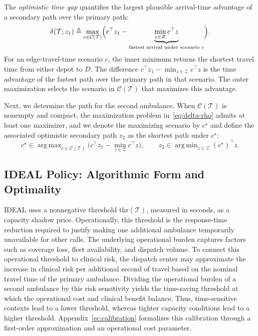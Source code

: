\documentclass[11pt, letterpaper, oneside, reqno]{amsart}
\DeclareMathOperator*{\argmin}{arg\,min}
\DeclareMathOperator*{\argmax}{arg\,max}
\newcommand{\opt}{^\star}
\newcommand{\Let}{\triangleq}
\begin{document}
The \textit{optimistic time gap} quantifies the largest plausible arrival-time advantage of a secondary path over the primary path:
\begin{equation}
\label{eq:delta-rho}
\delta(\mathcal T; z_1) \Let
\max_{c\in\mathcal C(\mathcal T)}
\Bigl( c^\top z_1  -  \underbrace{\min_{z \in\mathcal Z} c^\top z}_{\text{fastest arrival under scenario } c} \Bigr).
\end{equation}
For an edge-travel-time scenario $c$, the inner minimum returns the shortest travel time from either depot to $D$. The difference $c^\top z_1 - \min_{z\in\mathcal Z} c^\top z$ is the time advantage of the fastest path over the primary path in that scenario. The outer maximization selects the scenario in $\mathcal C(\mathcal T)$ that maximizes this advantage.

Next, we determine the path for the second ambulance. When $\mathcal C(\mathcal T)$ is nonempty and compact, the maximization problem in~\eqref{eq:delta-rho} admits at least one maximizer, and we denote the maximizing scenario by $c\opt$ and define the associated optimistic secondary path $z_2$ as the shortest path under $c\opt$:
\[
c\opt \in \argmax_{c\in\mathcal C(\mathcal T)}
\bigl(c^\top z_1 - \min_{z\in\mathcal Z} c^\top z\bigr), \qquad z_2 \in \argmin_{z\in\mathcal Z} (c\opt)^\top z.
\]


\subsection{IDEAL Policy: Algorithmic Form and Optimality} \label{sec:ideal-policy}
IDEAL uses a nonnegative threshold $\mathrm{thr}(\mathcal T)$, measured in seconds, as a capacity shadow price. Operationally, this threshold is the response-time reduction required to justify making one additional ambulance temporarily unavailable for other calls. The underlying operational burden captures factors such as coverage loss, fleet availability, and dispatch volume. To connect this operational threshold to clinical risk, the dispatch center may approximate the increase in clinical risk per additional second of travel based on the nominal travel time of the primary ambulance. Dividing the operational burden of a second ambulance by this risk sensitivity yields the time-saving threshold at which the operational cost and clinical benefit balance. Thus, time-sensitive contexts lead to a lower threshold, whereas tighter capacity conditions lead to a higher threshold. Appendix~\ref{ec:calibration} formalizes this calibration through a first-order approximation and an operational cost parameter.
\end{document}
